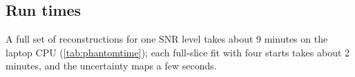 \subsection{Run times}



A full set of reconstructions for one SNR level takes about 9 minutes on the laptop CPU
(\cref{tab:phantomtime}); each full-slice fit with four starts takes about 2 minutes, and the
uncertainty maps a few seconds.
